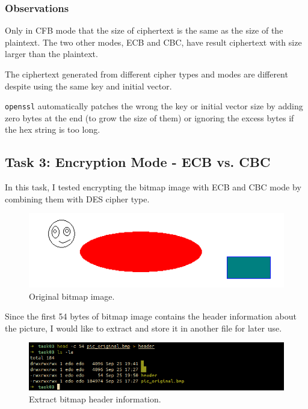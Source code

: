 \documentclass{article}
\begin{document}
\subsubsection{Observations}
Only in CFB mode that the size of ciphertext is the same as the size of the plaintext.
The two other modes, ECB and CBC, have result ciphertext with size larger than
the plaintext.

The ciphertext generated from different cipher types and modes are different
despite using the same key and initial vector.

\texttt{openssl} automatically patches the wrong the key or initial vector size
by adding zero bytes at the end (to grow the size of them) or ignoring the excess
bytes if the hex string is too long.

\subsection{Task 3: Encryption Mode - ECB vs. CBC}

In this task, I tested encrypting the bitmap image with ECB and CBC mode by
combining them with DES cipher type.

\begin{figure}[!ht]
    \centering
    \includegraphics[scale=0.68]{pic_original.png}
    \caption{Original bitmap image.}
\end{figure}

Since the first 54 bytes of bitmap image contains the header information about
the picture, I would like to extract and store it in another file for later use.

\begin{figure}[!ht]
    \centering
    \includegraphics[scale=0.68]{task03_header.png}
    \caption{Extract bitmap header information.}
\end{figure}
\end{document}

